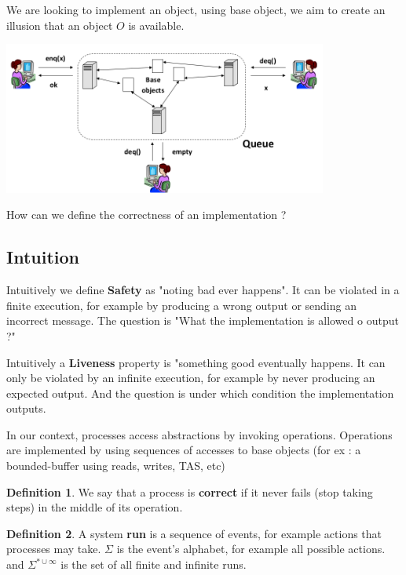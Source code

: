 \documentclass{article}
\theoremstyle{definition}
\newtheorem{definition}{Definition}[section]
\begin{document}
We are looking to implement an object, using base object, we aim to create an illusion that an object $O$ is available. 
\begin{center}
	\includegraphics[width=0.8\textwidth]{queue_implem}
\end{center}

How can we define the correctness of an implementation ?

\subsection{Intuition}

Intuitively we define \textbf{Safety} as "noting bad ever happens". It can be violated in a finite execution, for example by producing a wrong output or sending an incorrect message. The question is "What the implementation is allowed o output ?"

Intuitively a \textbf{Liveness} property is "something good eventually happens. It can only be violated by an infinite execution, for example by never producing an expected output. And the question is under which condition the implementation outputs.

In our context, processes access abstractions by invoking operations. Operations are implemented by using sequences of accesses to base objects (for ex : a bounded-buffer using reads, writes, TAS, etc)

\begin{definition}
We say that a process is \textbf{correct} if it never fails (stop taking steps) in the middle of its operation.
\end{definition}

\begin{definition}
A system \textbf{run} is a sequence of events, for example actions that processes may take.
$\Sigma$ is the event's alphabet, for example all possible actions. and $\Sigma^{*\cup\infty}$ is the set of all finite and infinite runs.
\end{definition}
\end{document}
